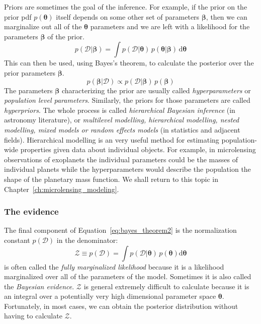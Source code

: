 \documentclass[12pt,dvipsnames]{report}
\newcommand{\ud}{\,\mathrm{d}}
\renewcommand{\vec}[1]{\boldsymbol{\mathbf{#1}}}
\begin{document}
Priors are sometimes the goal of the inference. For example, if the prior on
the prior pdf $p(\vec{\theta})$ itself depends on some other set of parameters
$\vec{\beta}$, then we can marginalize out all of the $\vec{\theta}$ parameters
and we are left with a likelihood for the parameters $\vec{\beta}$ of the
prior.
\begin{equation}
    p(\mathcal{D}\lvert\vec{\beta})=\int p(\mathcal{D}\lvert\vec{\theta})\,p(\vec{\theta}\lvert
    \vec{\beta})\ud \vec{\theta}
\end{equation}
This can then be used, using Bayes's theorem, to calculate the posterior
over the prior parameters $\bm\beta$.
\begin{equation}
    p(\bm\beta\lvert\mathcal{D})\propto p(\mathcal{D}\lvert\vec{\beta})
    \,p(\bm\beta)
\end{equation}
The parameters $\bm\beta$ characterizing the prior are usually called
\emph{hyperparameters} or \emph{population level parameters}. Similarly, the priors
for those parameters are called \emph{hyperpriors}.
The whole process is called \emph{hierarchical Bayesian inference}
(in astronomy literature),  or \emph{multilevel modelling, hierarchical modelling,
    nested modelling, mixed models or random effects models}
(in statistics and adjacent fields).
Hierarchical modelling is an very useful method for estimating
population-wide properties given data about individual objects. For example,
in microlensing observations of exoplanets the individual parameters could be the
masses of individual planets while the hyperparameters would describe the
population the shape of the planetary mass function. We shall return to this topic
in Chapter~\ref{ch:microlensing_modeling}.

\subsubsection{The evidence}
The final component of Equation~\ref{eq:bayes_theorem2} is the normalization
constant $ p(\mathcal{D})$ in the denominator:
\begin{equation}
    \mathcal{Z}\equiv p(\mathcal{D})=\int p(\mathcal D\lvert\boldsymbol\theta)\,p(\boldsymbol\theta)\textrm{d}\boldsymbol\theta
    \label{eq:evidence}
\end{equation}
is often called the \textsl{fully marginalized likelihood} because
it is a likelihood marginalized over all of the parameters of the model.
Sometimes
it is also called the \emph{Bayesian evidence}.
$\mathcal{Z}$ is general extremely difficult to calculate because it is an
integral over a potentially very high dimensional parameter space $\vec{\theta}$.
Fortunately, in most cases, we can obtain the posterior distribution without having
to calculate $\mathcal{Z}$.
\end{document}
